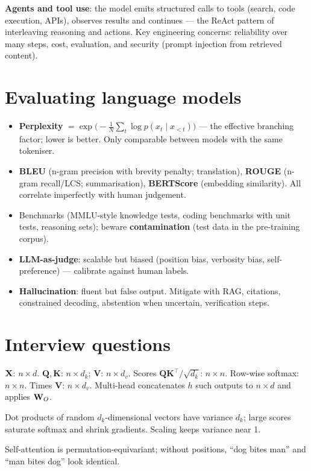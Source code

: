 \textbf{Agents and tool use}: the model emits structured calls to tools (search, code execution, APIs), observes results and continues --- the ReAct pattern of interleaving reasoning and actions. Key engineering concerns: reliability over many steps, cost, evaluation, and security (prompt injection from retrieved content).

\section{Evaluating language models}
\begin{itemize}
  \item \textbf{Perplexity} $=\exp\big(-\frac1N\sum_t\log p(x_t\mid x_{<t})\big)$ --- the effective branching factor; lower is better. Only comparable between models with the same tokeniser.
  \item \textbf{BLEU} (n-gram precision with brevity penalty; translation), \textbf{ROUGE} (n-gram recall/LCS; summarisation), \textbf{BERTScore} (embedding similarity). All correlate imperfectly with human judgement.
  \item Benchmarks (MMLU-style knowledge tests, coding benchmarks with unit tests, reasoning sets); beware \textbf{contamination} (test data in the pre-training corpus).
  \item \textbf{LLM-as-judge}: scalable but biased (position bias, verbosity bias, self-preference) --- calibrate against human labels.
  \item \textbf{Hallucination}: fluent but false output. Mitigate with RAG, citations, constrained decoding, abstention when uncertain, verification steps.
\end{itemize}

\section{Interview questions}
\A $\mathbf{X}$: $n\times d$. $\mathbf{Q},\mathbf{K}$: $n\times d_k$; $\mathbf{V}$: $n\times d_v$. Scores $\mathbf{Q}\mathbf{K}^\top/\sqrt{d_k}$: $n\times n$. Row-wise softmax: $n\times n$. Times $\mathbf{V}$: $n\times d_v$. Multi-head concatenates $h$ such outputs to $n\times d$ and applies $\mathbf{W}_O$.

\A Dot products of random $d_k$-dimensional vectors have variance $d_k$; large scores saturate softmax and shrink gradients. Scaling keeps variance near 1.

\A Self-attention is permutation-equivariant; without positions, ``dog bites man'' and ``man bites dog'' look identical.

